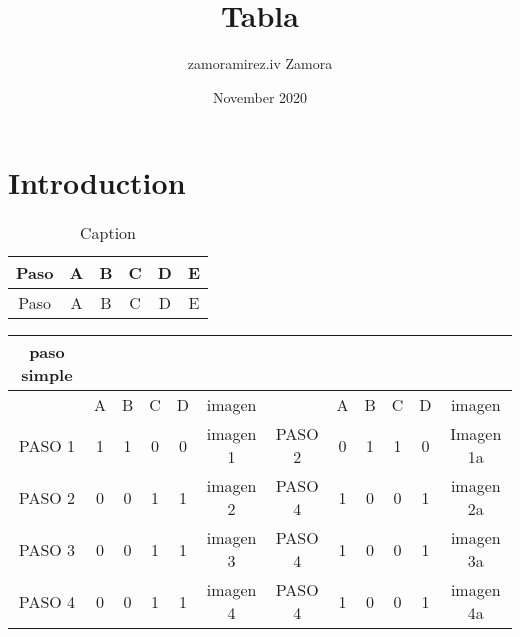 \documentclass{article}
\title{Tabla}
\author{zamoramirez.iv Zamora}
\date{November 2020}
\begin{document}
\maketitle

\section{Introduction}

\begin{table}[h!]
    \centering
    \begin{tabular}{c|c|c|c|c|c}
    \hline
          Paso & A & B & C & D & E \\ 
          \hline
          Paso & A & B & C & D & E \\
    \end{tabular}
    \caption{Caption}
    \label{tab:my_label}
\end{table}


\begin{table} [h!]
	\centering
	
	\label{tabla:pasoDobleySimple}
		\begin{tabular}{|c|c|c|c|c|c|c|c|c|c|c|c|}
			\hline 
			paso simple & 
			\\ 
			\hline 
			 & A  &  B & C  & D & imagen & & A & B & C & D & imagen \\ 
			\hline 
			PASO 1  & 1 & 1 & 0 & 0 & imagen 1 & PASO 2 & 0 & 1 & 1 & 0 & Imagen 1a\\ 
			\hline 
			PASO 2 & 0 & 0 & 1 & 1 & imagen 2 & PASO 4 & 1 & 0 & 0 & 1 & imagen 2a \\ 
			\hline
			PASO 3 & 0 & 0 & 1 & 1 & imagen 3 & PASO 4 & 1 & 0 & 0 & 1 & imagen 3a \\ 
			\hline
			PASO 4 & 0 & 0 & 1 & 1 & imagen 4 & PASO 4 & 1 & 0 & 0 & 1 & imagen 4a \\ 
			\hline
		\end{tabular} 
\end{table}
\end{document}
